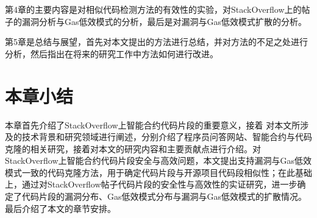 第4章的主要内容是对相似代码检测方法的有效性的实验，对StackOverflow上的帖子的漏洞分析与Gas低效模式的分析，最后是对漏洞与Gas低效模式扩散的分析。

第5章是总结与展望，首先对本文提出的方法进行总结，并对方法的不足之处进行分析，然后指出在将来的研究工作中方法如何进行改进。

\section{本章小结}
本章首先介绍了StackOverflow上智能合约代码片段的重要意义，接着 对本文所涉及的技术背景和研究领域进行阐述，分别介绍了程序员问答网站、智能合约与代码克隆的相关研究，接着对本文的研究内容和主要贡献点进行介绍。对StackOverflow上智能合约代码片段安全与高效问题，本文提出支持漏洞与Gas低效模式一致的代码克隆方法，用于确定代码片段与开源项目代码段相似性；在此基础上，通过对StackOverflow帖子代码片段的安全性与高效性的实证研究，进一步确定了代码片段的漏洞分布、Gas低效模式分布与漏洞与Gas低效模式的扩散情况。最后介绍了本文的章节安排。

